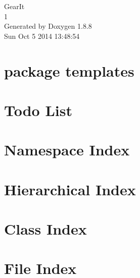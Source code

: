 \documentclass[twoside]{book}
\newcommand{\+}{\discretionary{\mbox{\scriptsize$\hookleftarrow$}}{}{}}
\newcommand{\clearemptydoublepage}{%
  \newpage{\pagestyle{empty}\cleardoublepage}%
}
\begin{document}
\hypersetup{pageanchor=false,
             bookmarks=true,
             bookmarksnumbered=true,
             pdfencoding=unicode
            }
\begin{titlepage}
\vspace*{7cm}
\begin{center}%
{\Large Gear\+It \\[1ex]\large 1 }\\
\vspace*{1cm}
{\large Generated by Doxygen 1.8.8}\\
\vspace*{0.5cm}
{\small Sun Oct 5 2014 13:48:54}\\
\end{center}
\end{titlepage}
\clearemptydoublepage
\tableofcontents
\clearemptydoublepage
{}
\hypersetup{pageanchor=true}

\chapter{package templates}
\label{index}\hypertarget{index}{}
\chapter{Todo List}
\label{todo}
\hypertarget{todo}{}

\chapter{Namespace Index}

\chapter{Hierarchical Index}

\chapter{Class Index}

\chapter{File Index}

\end{document}
